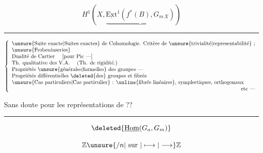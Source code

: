 
\[H^1(X,\underbrace{\underline{\mathrm{Ext}}^1(f^*(B),G_{m\,X})})\]


\hrule

\[\left\{\begin{array}{l}
\text{\unsure{Suite exacte|Suites exactes} de Cohomologie. Critère de \unsure{trivialité|representabilité} ;}\\
\text{\unsure{Frobeniuseries}}\\
\text{Dualité de Cartier \quad [pour Pic ---]}\\
\text{Th. qualitative des V.A. \quad (Th. de rigidité.)}\\
\text{Propriétés \unsure{générales|formelles} des groupes ---}\\
\text{Propriétés différentielles \deleted{des} groupes et fibrés}\\
\text{\unsure{Cas particuliers|Cas particulier} : \uuline{fibrés linéaires}, symplectiques, orthogonaux}\\
\hfill\text{etc ---}
\end{array}\right.\]

Sans doute pour les représentations  de  ??

\hrule

\[\deleted{\underline{\mathrm{Hom}}(G_a,G_m)}\]

\[\mathbb Z\unsure{/n|\text{ sur }|\longmapsto|\longrightarrow}\mathbb Z\]
